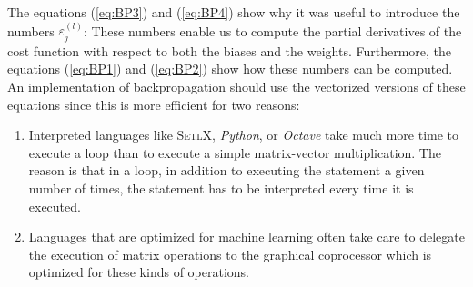 The equations (\ref{eq:BP3}) and (\ref{eq:BP4}) show why it was useful to introduce the
numbers $\varepsilon_j^{(l)}$: These numbers enable us to compute the partial derivatives of the cost function
with respect to both the biases and the weights.  Furthermore, the equations (\ref{eq:BP1}) and (\ref{eq:BP2})
show how these numbers can be computed.  An implementation of backpropagation should use the vectorized
versions of these equations since this is more efficient for two reasons:
\begin{enumerate}
\item Interpreted languages like \textsc{SetlX}, \textsl{Python}, or \textsl{Octave} take much more time to
      execute a loop than to execute a simple matrix-vector multiplication.  The reason is that in a loop, in
      addition to executing the statement a given number of times, the statement has to be interpreted 
      every time it is executed.
\item Languages that are optimized for machine learning often take care to delegate the execution of matrix
      operations to the graphical coprocessor which is optimized for these kinds of operations.  
\end{enumerate}

